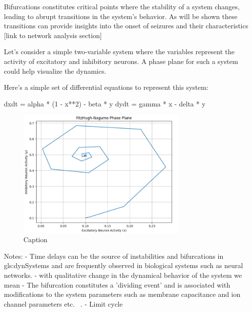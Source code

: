 \documentclass[../../Orator.tex]{subfiles}
\begin{document}
Bifurcations constitutes critical points where the stability of a system changes, leading to abrupt transitions in the system's behavior. As will be shown these transitions can provide insights into the onset of seizures and their characteristics [link to network analysis section]


Let's consider a simple two-variable system where the variables represent the activity of excitatory and inhibitory neurons. A phase plane for such a system could help visualize the dynamics.

Here's a simple set of differential equations to represent this system:


dxdt = alpha * (1 - x**2) - beta * y
    dydt = gamma * x - delta * y


\begin{figure}[ht]
    \centering
    \includegraphics[width = 0.75\textwidth]{Pictures/Kenni/FitzHugh-Nagumo Phase Plane.png}
    \caption{Caption}
    \label{fig:Phase_Plane}
\end{figure}

Notes:
- Time delays can be the source of instabilities and bifurcations in \gls{gls:dynSystem}s and are frequently observed in biological systems such as neural networks.
- with qualitative change in the dynamical behavior of the system we mean 
- The bifurcation constitutes a 'dividing event' and is associated with modifications to the system parameters such as membrane capacitance and ion channel parameters etc. ~\cite{STEFANESCU2012748}.
- Limit cycle
\end{document}
